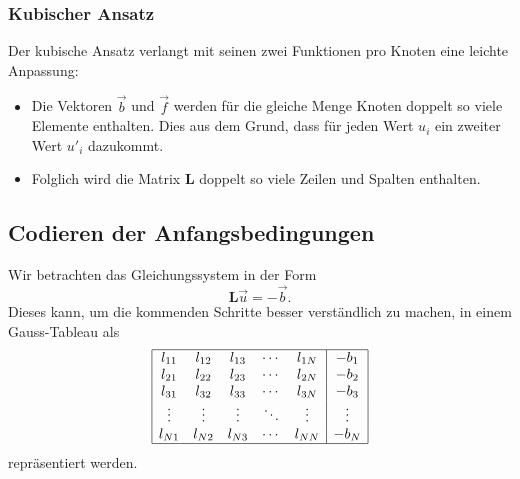 \subsubsection{Kubischer Ansatz}
Der kubische Ansatz verlangt mit seinen zwei Funktionen pro Knoten eine leichte Anpassung: 
\begin{itemize}
    \item Die Vektoren $\vec{b}$ und $\vec{f}$ werden für die gleiche Menge Knoten doppelt so viele Elemente enthalten.
          Dies aus dem Grund, dass für jeden Wert $u_i$ ein zweiter Wert $u'_i$ dazukommt.
    \item Folglich wird die Matrix $\mathbf{L}$ doppelt so viele Zeilen und Spalten enthalten. 
\end{itemize}


\subsection{Codieren der Anfangsbedingungen\label{fem:1d:anfangsbedingungen}}
Wir betrachten das Gleichungssystem in der Form 
\begin{equation}
    \mathbf{L}\vec{u} = -\vec{b}. 
    \label{fem:1d:gleichungssystem}
\end{equation}
Dieses kann, um die kommenden Schritte besser verständlich zu machen, in einem Gauss-Tableau als
\begin{equation}
    \begin{array}{|ccccc|c|}
        \hline
        l_{11} & l_{12} & l_{13} & \cdots & l_{1N} & -b_1   \\
        l_{21} & l_{22} & l_{23} & \cdots & l_{2N} & -b_2   \\
        l_{31} & l_{32} & l_{33} & \cdots & l_{3N} & -b_3   \\
        \vdots & \vdots & \vdots & \ddots & \vdots & \vdots \\
        l_{N1} & l_{N2} & l_{N3} & \cdots & l_{NN} & -b_N   \\
        \hline
    \end{array}
\end{equation}
repräsentiert werden.


